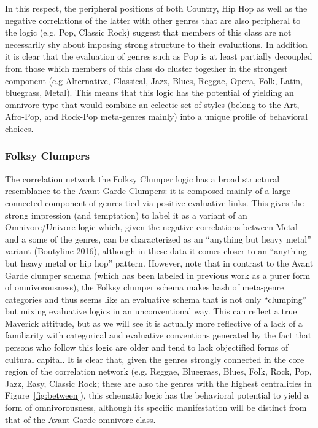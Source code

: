 \documentclass[preprint,12pt]{elsarticle}
\begin{document}
In this respect, the peripheral positions of both Country, Hip Hop as well as the negative correlations of the latter with other genres that are also peripheral to the logic (e.g. Pop, Classic Rock) suggest that members of this class are not necessarily shy about imposing strong structure to their evaluations. In addition it is clear that the evaluation of genres such as Pop is at least partially decoupled from those which members of this class do cluster together in the strongest  component (e.g Alternative, Classical, Jazz, Blues, Reggae, Opera, Folk, Latin, bluegrass, Metal). This means that this logic has the potential of yielding an omnivore type that would combine an eclectic set of styles (belong to the Art, Afro-Pop, and Rock-Pop meta-genres mainly) into a unique profile of behavioral choices.  

\subsubsection{Folksy Clumpers}
The correlation network the Folksy Clumper logic has a broad structural resemblance to the Avant Garde Clumpers: it is composed mainly of a large connected component of genres tied via positive evaluative links. This gives the strong impression (and temptation) to label it as a variant of an Omnivore/Univore logic which, given the negative correlations between Metal and a some of the genres, can be characterized as an ``anything but heavy metal'' variant (Boutyline 2016), although in these data it comes closer to an ``anything but heavy metal or hip hop'' pattern. However, note that in contrast to the Avant Garde clumper schema (which has been labeled in previous work as a purer form of omnivorousness), the Folksy clumper schema makes hash of meta-genre categories and thus seems like an evaluative schema that is not only ``clumping'' but mixing evaluative logics in an unconventional way. This can reflect a true Maverick attitude, but as we will see it is actually more reflective of a lack of a familiarity with categorical and evaluative conventions generated by the fact that persons who follow this logic are older and tend to lack objectified forms of cultural capital. It is clear that, given the genres strongly connected in the core region of the correlation network (e.g. Reggae, Bluegrass, Blues, Folk, Rock, Pop, Jazz, Easy, Classic Rock; these are also the genres with the highest centralities in Figure~\ref{fig:between}), this schematic logic has the behavioral potential to yield a form of omnivorousness, although its specific manifestation will be distinct from that of the Avant Garde omnivore class. 
\end{document}
